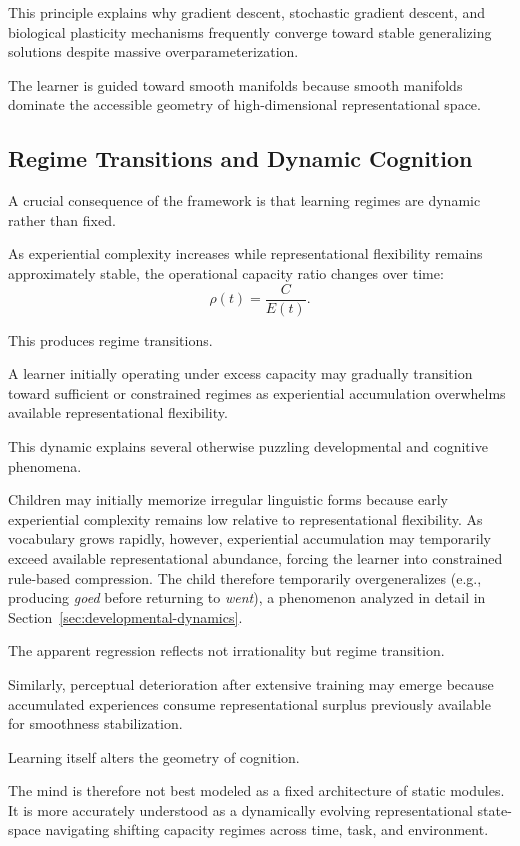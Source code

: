 \documentclass[12pt,a4paper]{article}
\begin{document}
This principle explains why gradient descent, stochastic gradient descent, and biological plasticity mechanisms frequently converge toward stable generalizing solutions despite massive overparameterization.

The learner is guided toward smooth manifolds because smooth manifolds dominate the accessible geometry of high-dimensional representational space.

\subsection{Regime Transitions and Dynamic Cognition}

A crucial consequence of the framework is that learning regimes are dynamic rather than fixed.

As experiential complexity increases while representational flexibility remains approximately stable, the operational capacity ratio changes over time:
\[
\rho(t) = \frac{C}{E(t)}.
\]

This produces regime transitions.

A learner initially operating under excess capacity may gradually transition toward sufficient or constrained regimes as experiential accumulation overwhelms available representational flexibility.

This dynamic explains several otherwise puzzling developmental and cognitive phenomena.

Children may initially memorize irregular linguistic forms because early experiential complexity remains low relative to representational flexibility. As vocabulary grows rapidly, however, experiential accumulation may temporarily exceed available representational abundance, forcing the learner into constrained rule-based compression. The child therefore temporarily overgeneralizes (e.g., producing \textit{goed} before returning to \textit{went}), a phenomenon analyzed in detail in Section~\ref{sec:developmental-dynamics}.

The apparent regression reflects not irrationality but regime transition.

Similarly, perceptual deterioration after extensive training may emerge because accumulated experiences consume representational surplus previously available for smoothness stabilization.

Learning itself alters the geometry of cognition.

The mind is therefore not best modeled as a fixed architecture of static modules. It is more accurately understood as a dynamically evolving representational state-space navigating shifting capacity regimes across time, task, and environment.
\end{document}
